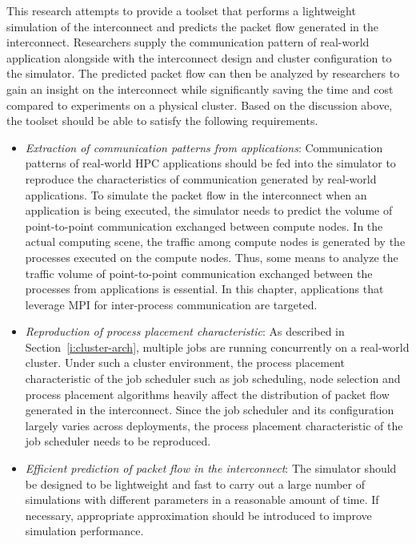 This research attempts to provide a toolset that performs a lightweight
simulation of the interconnect and predicts the packet flow generated in the
interconnect. Researchers supply the communication pattern of real-world
application alongside with the interconnect design and cluster configuration
to the simulator. The predicted packet flow can then be analyzed by
researchers to gain an insight on the interconnect while significantly saving
the time and cost compared to experiments on a physical cluster. Based on the
discussion above, the toolset should be able to satisfy the following
requirements.

\begin{itemize}
\item
  \emph{Extraction of communication patterns from applications}:
  Communication patterns of real-world HPC applications should be fed
  into the simulator to reproduce the characteristics of communication
  generated by real-world applications. To simulate the packet flow in
  the interconnect when an application is being executed, the simulator
  needs to predict the volume of point-to-point communication exchanged
  between compute nodes. In the actual computing scene, the traffic
  among compute nodes is generated by the processes executed on the
  compute nodes. Thus, some means to analyze the traffic volume of
  point-to-point communication exchanged between the processes from
  applications is essential. In this chapter, applications that leverage
  MPI for inter-process communication are targeted.
\item
  \emph{Reproduction of process placement characteristic}:
  As described in Section~\ref{i:cluster-arch}, multiple jobs are running
  concurrently on a real-world cluster. Under such a cluster environment, the
  process placement characteristic of the job scheduler such as job
  scheduling, node selection and process placement algorithms heavily affect
  the distribution of packet flow generated in the interconnect. Since the
  job scheduler and its configuration largely varies across deployments,
  the process placement characteristic of the job scheduler needs to be
  reproduced.
\item
  \emph{Efficient prediction of packet flow in the interconnect}:
  The simulator should be designed to be lightweight and fast
  to carry out a large number of simulations with different parameters in
  a reasonable amount of time. If necessary, appropriate approximation
  should be introduced to improve simulation performance.
\end{itemize}

